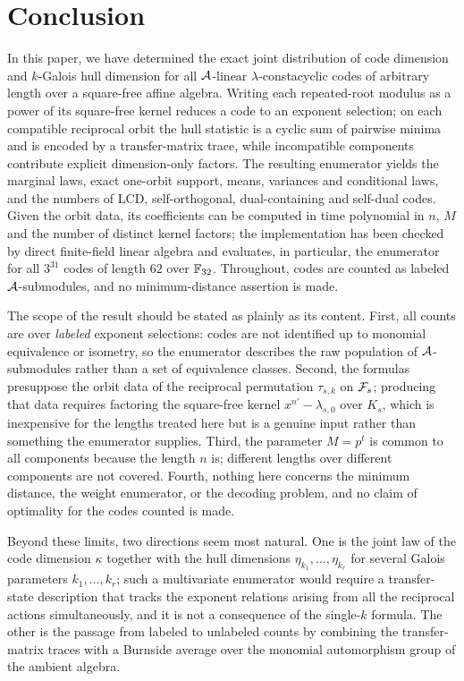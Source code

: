 \section{Conclusion}\label{sec:conclusions}
In this paper, we have determined the exact joint distribution of code dimension and
$k$-Galois hull dimension for all $\mathcal A$-linear $\lambda$-constacyclic codes
of arbitrary length over a square-free affine algebra. Writing each
repeated-root modulus as a power of its square-free kernel reduces a code to
an exponent selection; on each compatible reciprocal orbit the hull statistic
is a cyclic sum of pairwise minima and is encoded by a transfer-matrix trace,
while incompatible components contribute explicit dimension-only factors. The
resulting enumerator yields the marginal laws, exact one-orbit support,
means, variances and conditional laws, and the numbers of LCD,
self-orthogonal, dual-containing and self-dual codes. Given the orbit data,
its coefficients can be computed in time polynomial in $n$, $M$ and the
number of distinct kernel factors; the implementation has been checked by
direct finite-field linear algebra and evaluates, in particular, the
enumerator for all $3^{31}$ codes of length $62$ over $\mathbb F_{32}$. Throughout,
codes are counted as labeled $\mathcal A$-submodules, and no minimum-distance
assertion is made.

The scope of the result should be stated as plainly as its content. First, all
counts are over \emph{labeled} exponent selections: codes are not identified up
to monomial equivalence or isometry, so the enumerator describes the raw
population of $\mathcal A$-submodules rather than a set of equivalence classes.
Second, the formulas presuppose the orbit data of the reciprocal permutation
$\tau_{s,k}$ on $\mathcal F_s$; producing that data requires factoring the square-free
kernel $x^{n'}-\lambda_{s,0}$ over $K_s$, which is inexpensive for the lengths
treated here but is a genuine input rather than something the enumerator
supplies. Third, the parameter $M=p^t$ is common to all components because the
length $n$ is; different lengths over different components are not covered.
Fourth, nothing here concerns the minimum distance, the weight enumerator, or
the decoding problem, and no claim of optimality for the codes counted is made.

Beyond these limits, two directions seem most natural. One is the joint law of
the code dimension $\kappa$ together with the hull dimensions
$\eta_{k_1},\ldots,\eta_{k_r}$ for several Galois parameters
$k_1,\ldots,k_r$; such a multivariate enumerator would require a transfer-state
description that tracks the exponent relations arising from all the reciprocal
actions simultaneously, and it is not a consequence of the single-$k$ formula.
The other is the passage from labeled to unlabeled counts by combining the
transfer-matrix traces with a Burnside average over the monomial automorphism
group of the ambient algebra.

